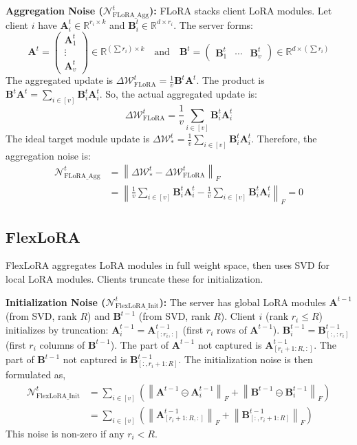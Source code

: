 \documentclass{article} %
\newcommand{\mat}[1]{\mathbf{#1}}
\begin{document}
\textbf{Aggregation Noise ($\mathcal{N}_{\text{FLoRA\_Agg}}^{t}$):} FLoRA stacks client LoRA modules. Let client $i$ have $\mat{A}_i^t \in \mathbb{R}^{r_i \times k}$ and $\mat{B}_i^t \in \mathbb{R}^{d \times r_i}$.
The server forms:
$$\mat{A}_{}^t = \begin{pmatrix} \mat{A}_1^t \\ \vdots \\ \mat{A}_v^t \end{pmatrix} \in \mathbb{R}^{(\sum r_i) \times k} \quad \text{and} \quad \mat{B}_{}^t = \begin{pmatrix} \mat{B}_1^t & \cdots & \mat{B}_v^t \end{pmatrix} \in \mathbb{R}^{d \times (\sum r_i)}$$
The aggregated update is $\Delta\boldsymbol{\mathcal{W}}_{\text{FLoRA}}^t = \frac{1}{v} \mat{B}_{}^t \mat{A}_{}^t$.
The product is $\mat{B}_{}^t \mat{A}_{}^t = \sum_{i\in[v]} \mat{B}_i^t \mat{A}_i^t$.
So, the actual aggregated update is:
$$\Delta\boldsymbol{\mathcal{W}}_{\text{FLoRA}}^t = \frac{1}{v} \sum_{i\in[v]} \mat{B}_i^t \mat{A}_i^t$$
The ideal target module update is $\Delta \boldsymbol{\mathcal{W}}_{*}^t = \frac{1}{v} \sum_{i\in[v]} \mat{B}_i^t \mat{A}_i^t$.
Therefore, the aggregation noise is:
\begin{align*}
\mathcal{N}_{\text{FLoRA\_Agg}}^{t} &= \left\| \Delta \boldsymbol{\mathcal{W}}_{*}^t - \Delta \boldsymbol{\mathcal{W}}_{\text{FLoRA}}^t \right\|_F \\
&= \left\| \frac{1}{v} \sum_{i\in[v]} \mat{B}_i^t \mat{A}_i^t - \frac{1}{v} \sum_{i\in[v]} \mat{B}_i^t \mat{A}_i^t \right\|_F = 0
\end{align*}

\subsection{FlexLoRA} \label{appendixsubsection:flexlora}
FlexLoRA aggregates LoRA modules in full weight space, then uses SVD for local LoRA modules. Clients truncate these for initialization.

\textbf{Initialization Noise ($\mathcal{N}_{\text{FlexLoRA\_Init}}^{t}$):} The server has global LoRA modules $\mat{A}^{t-1}$ (from SVD, rank $R$) and $\mat{B}^{t-1}$ (from SVD, rank $R$).
Client $i$ (rank $r_i \le R$) initializes by truncation:
$\mat{A}_i^{t-1} = \mat{A}^{t-1}_{[:r_i, :]}$ (first $r_i$ rows of $\mat{A}^{t-1}$).
$\mat{B}_i^{t-1} = \mat{B}^{t-1}_{[:, :r_i]}$ (first $r_i$ columns of $\mat{B}^{t-1}$).
The part of $\mat{A}^{t-1}$ not captured is $\mat{A}^{t-1}_{[r_i+1:R, :]}$.
The part of $\mat{B}^{t-1}$ not captured is $\mat{B}^{t-1}_{[:, r_i+1:R]}$. The initialization noise is then formulated as,
\begin{align*}
\mathcal{N}_{\text{FlexLoRA\_Init}}^{t} &= \sum_{i\in[v]} \left(\left\|{\mat{A}}^{t-1}\ominus {\mat{A}}_i^{t-1}\right\|_F + \left\|{\mat{B}}^{t-1}\ominus {\mat{B}}_i^{t-1}\right\|_F\right) \\
&= \sum_{i\in[v]} \left( \left\| \mat{A}^{t-1}_{[r_i+1:R, :]} \right\|_F + \left\| \mat{B}^{t-1}_{[:, r_i+1:R]} \right\|_F \right)
\end{align*}
This noise is non-zero if any $r_i < R$.
\end{document}
